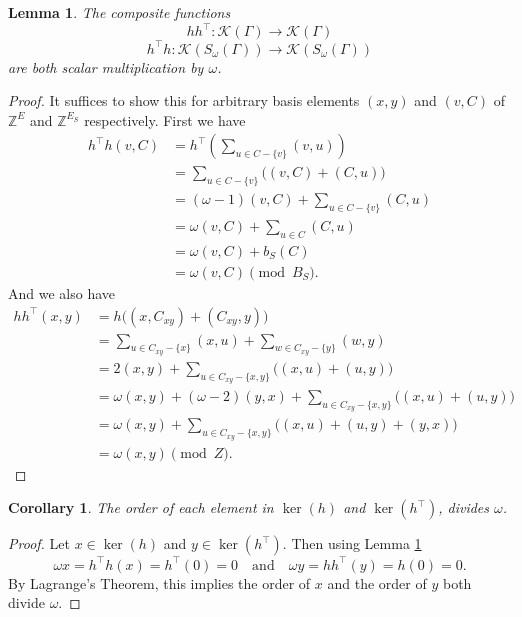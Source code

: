 \documentclass[12pt]{report}
\newtheorem{lem}[thm]{Lemma}
\newtheorem{cor}[thm]{Corollary}
\theoremstyle{definition}
\begin{document}
\begin{lem}\label{lem:scalar}
    The composite functions 
    \[h h^\top:\mathcal{K}(\Gamma) \rightarrow \mathcal{K}(\Gamma)\]
    \[h^\top  h:\mathcal{K}(S_\omega(\Gamma)) \rightarrow \mathcal{K}(S_\omega(\Gamma))\] are both scalar multiplication by $\omega$.
\end{lem}
\begin{proof}
    It suffices to show this for arbitrary basis elements $(x,y)$ and $(v,C)$ of $\mathbb{Z}^{E}$ and $\mathbb{Z}^{E_S}$ respectively. First we have
    \begin{align*}
        h^\top h(v,C) &=h^\top \left( \sum_{u\in C-\{v\}}(v,u)\right) \\
        &=\sum_{u\in C-\{v\}} \Big((v, C)+(C,u)\Big) \\
        &= (\omega-1)(v,C)+\sum_{u\in C-\{v\}}(C,u)  \\
        &= \omega(v,C)+\sum_{u\in C}(C,u)  \\
        &= \omega(v,C)+b_S(C) \\
        &= \omega(v,C) \pmod{B_S}.
        \end{align*}
    And we also have
    \begin{align*}
        hh^\top(x,y) &=h\Big( (x,C_{xy})+(C_{xy},y) \Big) \\
        &= \sum_{u\in C_{xy}-\{x\}}(x,u)+\sum_{w\in C_{xy}-\{y\}}(w,y) \\
        &= 2(x,y)+\sum_{u\in C_{xy}-\{x,y\}} \Big( (x,u) +(u,y) \Big) \\
        &= \omega(x,y) +(\omega -2)(y,x)+\sum_{u\in C_{xy}-\{x,y\}} \Big( (x,u) +(u,y) \Big) \\
        &= \omega(x,y) +\sum_{u\in C_{xy}-\{x,y\}} \Big( (x,u) +(u,y) +(y,x) \Big) \\
        &= \omega(x,y) \pmod{Z}.
    \end{align*}
\end{proof}
\begin{cor}
    The order of each element in $\ker(h)$ and $\ker(h^\top)$, divides $\omega$.
\end{cor}
\begin{proof}
    Let $x \in \ker(h)$ and $y \in \ker(h^\top)$. Then using Lemma \ref{lem:scalar}
    \[\omega x = h^\top h(x) = h^\top(0) =0\quad \text{and} \quad \omega y = hh^\top(y) = h(0) =0.\]
    By Lagrange's Theorem, this implies the order of $x$ and the order of $y$ both divide $\omega$.
\end{proof}\par
\end{document}
